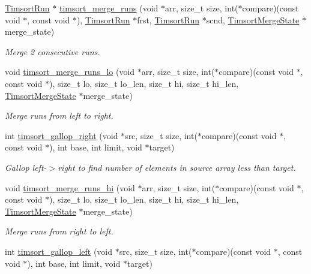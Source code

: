 \begin{DoxyCompactItemize}
\hyperlink{structTimsortRun}{Timsort\+Run} $\ast$ \hyperlink{group__Timsort_ga62d32e069756222c797c569f08220237}{timsort\+\_\+merge\+\_\+runs} (void $\ast$arr, size\+\_\+t size, int($\ast$compare)(const void $\ast$, const void $\ast$), \hyperlink{structTimsortRun}{Timsort\+Run} $\ast$frst, \hyperlink{structTimsortRun}{Timsort\+Run} $\ast$scnd, \hyperlink{structTimsortMergeState}{Timsort\+Merge\+State} $\ast$merge\+\_\+state)
\begin{DoxyCompactList}\small\item\em Merge 2 consecutive runs. \end{DoxyCompactList}\item 
void \hyperlink{group__Timsort_ga67d92f57e1b421c1110d15ea25492bb4}{timsort\+\_\+merge\+\_\+runs\+\_\+lo} (void $\ast$arr, size\+\_\+t size, int($\ast$compare)(const void $\ast$, const void $\ast$), size\+\_\+t lo, size\+\_\+t lo\+\_\+len, size\+\_\+t hi, size\+\_\+t hi\+\_\+len, \hyperlink{structTimsortMergeState}{Timsort\+Merge\+State} $\ast$merge\+\_\+state)
\begin{DoxyCompactList}\small\item\em Merge runs from left to right. \end{DoxyCompactList}\item 
int \hyperlink{group__Timsort_ga59524f2247f32032582b8f17ab93a1f6}{timsort\+\_\+gallop\+\_\+right} (void $\ast$src, size\+\_\+t size, int($\ast$compare)(const void $\ast$, const void $\ast$), int base, int limit, void $\ast$target)
\begin{DoxyCompactList}\small\item\em Gallop left-\/$>$right to find number of elements in source array less than target. \end{DoxyCompactList}\item 
void \hyperlink{group__Timsort_gab79f5bad70cecab915e4a564516cf5a8}{timsort\+\_\+merge\+\_\+runs\+\_\+hi} (void $\ast$arr, size\+\_\+t size, int($\ast$compare)(const void $\ast$, const void $\ast$), size\+\_\+t lo, size\+\_\+t lo\+\_\+len, size\+\_\+t hi, size\+\_\+t hi\+\_\+len, \hyperlink{structTimsortMergeState}{Timsort\+Merge\+State} $\ast$merge\+\_\+state)
\begin{DoxyCompactList}\small\item\em Merge runs from right to left. \end{DoxyCompactList}\item 
int \hyperlink{group__Timsort_gac60918d0e6930ae4dd66dc5376b74649}{timsort\+\_\+gallop\+\_\+left} (void $\ast$src, size\+\_\+t size, int($\ast$compare)(const void $\ast$, const void $\ast$), int base, int limit, void $\ast$target)

\end{DoxyCompactItemize}
